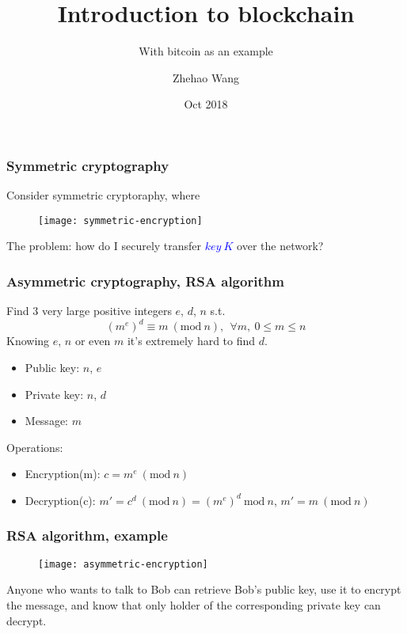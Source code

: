 \documentclass{beamer}
\begin{document}
\title{Introduction to blockchain}
\subtitle{With bitcoin as an example}
\author{Zhehao Wang}
\date{Oct 2018}

\frame{\titlepage}

\begin{frame}
\frametitle{Symmetric cryptography}

Consider symmetric cryptoraphy, where

\begin{figure}
  \centering
  \texttt{[image: symmetric-encryption]}
\end{figure}

The problem: how do I securely transfer \textcolor{blue}{$key~K$} over the network?

\end{frame}

\begin{frame}
\frametitle{Asymmetric cryptography, RSA algorithm}

Find 3 very large positive integers $e$, $d$, $n$ s.t.
$$
(m^e)^d \equiv m ~ (\text{mod} ~ n), ~ ~ \forall m,~ 0 \leq m \le n
$$
Knowing $e$, $n$ or even $m$ it's extremely hard to find $d$.

\begin{itemize}
  \item Public key: $n$, $e$
  \item Private key: $n$, $d$
  \item Message: $m$
\end{itemize}

Operations:
\begin{itemize}
    \item Encryption(m): $c = m^e ~ (\text{mod} ~ n)$
    \item Decryption(c): $m' = c^d ~ (\text{mod} ~ n) = (m^e)^d ~ \text{mod} ~ n$, $m' = m ~ (\text{mod} ~ n)$
\end{itemize}

\end{frame}

\begin{frame}
\frametitle{RSA algorithm, example}

\begin{figure}
  \centering
  \texttt{[image: asymmetric-encryption]}
\end{figure}

Anyone who wants to talk to Bob can retrieve Bob's public key, use it to encrypt the message, and know that only holder of the corresponding private key can decrypt.

\end{frame}
\end{document}
